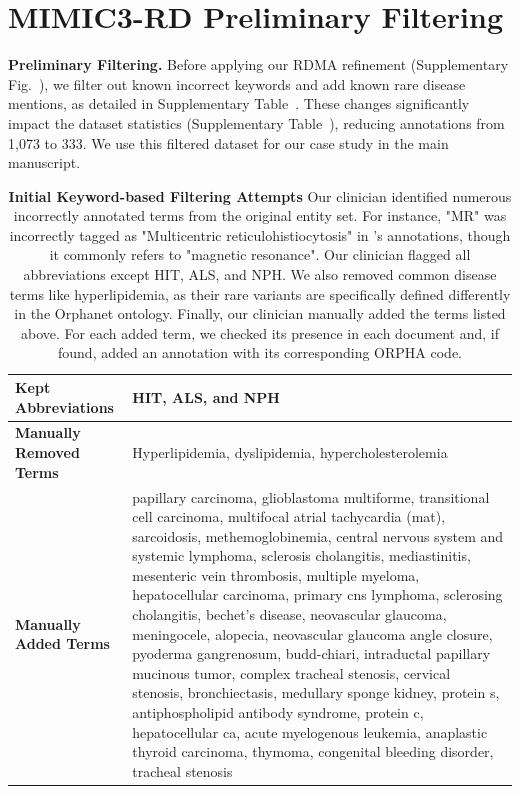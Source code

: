 \section*{MIMIC3-RD Preliminary Filtering}
\textbf{Preliminary Filtering.} Before applying our RDMA refinement (Supplementary Fig.~\sFigExAnnotation{}), we filter out known incorrect keywords and add known rare disease mentions, as detailed in Supplementary Table~\sTabFilterDetails. These changes significantly impact the dataset statistics (Supplementary Table~\sTabFilterResults), reducing annotations from 1,073 to 333. We use this filtered dataset for our case study in the main manuscript.

\begin{table}[h]
\centering
\begin{tabular}{|p{}|p{}|}
\hline
\textbf{Kept Abbreviations} & HIT, ALS, and NPH \\
\hline
\textbf{Manually Removed Terms} & Hyperlipidemia, dyslipidemia, hypercholesterolemia \\
\hline
\textbf{Manually Added Terms} & papillary carcinoma, glioblastoma multiforme, transitional cell carcinoma, multifocal atrial tachycardia (mat), sarcoidosis, methemoglobinemia, central nervous system and systemic lymphoma, sclerosis cholangitis, mediastinitis, mesenteric vein thrombosis, multiple myeloma, hepatocellular carcinoma, primary cns lymphoma, sclerosing cholangitis, bechet's disease, neovascular glaucoma, meningocele, alopecia, neovascular glaucoma angle closure, pyoderma gangrenosum, budd-chiari, intraductal papillary mucinous tumor, complex tracheal stenosis, cervical stenosis, bronchiectasis, medullary sponge kidney, protein s, antiphospholipid antibody syndrome, protein c, hepatocellular ca, acute myelogenous leukemia, anaplastic thyroid carcinoma, thymoma, congenital bleeding disorder, tracheal stenosis \\
\hline
\end{tabular}
\caption{\textbf{Initial Keyword-based Filtering Attempts} Our clinician identified numerous incorrectly annotated terms from the original entity set. For instance, "MR" was incorrectly tagged as "Multicentric reticulohistiocytosis" in \cite{dong2023ontology_poor_annotations}'s annotations, though it commonly refers to "magnetic resonance". Our clinician flagged all abbreviations except HIT, ALS, and NPH. We also removed common disease terms like hyperlipidemia, as their rare variants are specifically defined differently in the Orphanet ontology. Finally, our clinician manually added the terms listed above. For each added term, we checked its presence in each document and, if found, added an annotation with its corresponding ORPHA code.}
\label{tab:Filtering_Details_ex}
\end{table}

